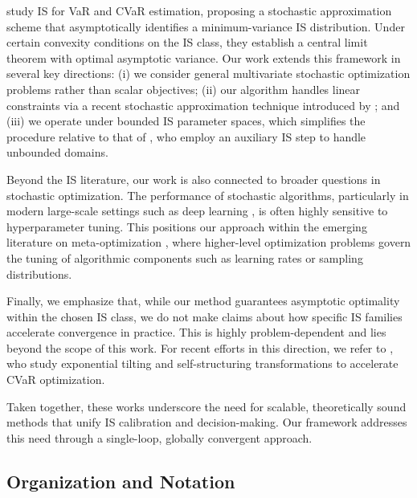 \documentclass[11pt,a4paper]{article}
\theoremstyle{definition}
\begin{document}
\citet{Bardou2009computing} study IS for VaR and CVaR estimation, proposing a stochastic approximation scheme that asymptotically identifies a minimum-variance IS distribution. Under certain convexity conditions on the IS class, they establish a central limit theorem with optimal asymptotic variance. Our work extends this framework in several key directions: (i) we consider general multivariate stochastic optimization problems rather than scalar objectives; (ii) our algorithm handles linear constraints via a recent stochastic approximation technique introduced by \citet{duchi2021asymptotic}; and (iii) we operate under bounded IS parameter spaces, which simplifies the procedure relative to that of \citet{Bardou2009computing}, who employ an auxiliary IS step to handle unbounded domains.

Beyond the IS literature, our work is also connected to broader questions in stochastic optimization. The performance of stochastic algorithms, particularly in modern large-scale settings such as deep learning \cite{bengio2012practical}, is often highly sensitive to hyperparameter tuning. This positions our approach within the emerging literature on meta-optimization \cite{hospedales2021meta}, where higher-level optimization problems govern the tuning of algorithmic components such as learning rates or sampling distributions.

Finally, we emphasize that, while our method guarantees asymptotic optimality within the chosen IS class, we do not make claims about how specific IS families accelerate convergence in practice. This is highly problem-dependent and lies beyond the scope of this work. For recent efforts in this direction, we refer to \citet{deo2023achieving, deo2024importance}, who study exponential tilting and self-structuring transformations to accelerate CVaR optimization.

Taken together, these works underscore the need for scalable, theoretically sound methods that unify IS calibration and decision-making. Our framework addresses this need through a single-loop, globally convergent approach.


\subsection{Organization and Notation}
\end{document}

